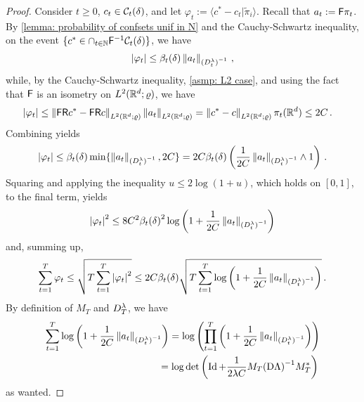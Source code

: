 \begin{proof}
    Consider $t\ge 0$, $c_t\in\mathcal{C}_t(\delta)$, and let $\varphi_t:=\langle c^* - c_t\vert \tilde\pi_i\rangle$. Recall that $a_t:=\mathsf{F}\pi_t$. By \cref{lemma: probability of confsets unif in N} and the Cauchy-Schwartz inequality, on the event $\{c^*\in \cap_{t\in\mathbb{N}}\mathsf{F}^{-1}\mathcal{C}_t(\delta)\}$, we have 
    \begin{align*}
        \left\lvert \varphi_t \right\rvert \le \beta_t(\delta)\left\lVert a_t\right\rVert_{{(D^\lambda_t)}^{-1}}\,,
    \end{align*}
    while, by the Cauchy-Schwartz inequality, \cref{asmp: L2 case}, and using the fact that $\mathsf{F}$ is an isometry on $L^2(\mathbb{R}^d;\varrho)$, we have 
    \begin{align*}
        \left\lvert \varphi_t \right\rvert &\le \left\lVert\mathsf{F}\mathsf{R} c^* - \mathsf{F}\mathsf{R} c\right\rVert_{L^2(\mathbb{R}^d;\varrho)}\left\lVert a_t\right\rVert_{L^2(\mathbb{R}^d;\varrho)}= \left\lVert c^*-c\right\rVert_{L^2(\mathbb{R}^d;\varrho)}\pi_t(\mathbb{R}^d)\le 2C\,.
    \end{align*}
    Combining yields
    \begin{align*}
        \left\lvert \varphi_t \right\rvert\le \beta_t(\delta)\min\{\left\lVert a_t\right\rVert_{{(D^\lambda_t)}^{-1}},2C\}=2C\beta_t(\delta)\left(\frac{1}{2C}\left\lVert a_t\right\rVert_{{(D^\lambda_t)}^{-1}}\wedge 1 \right) \,.
    \end{align*}
    Squaring and applying the inequality $u\le 2\log(1+u)$, which holds on $[0,1]$, to the final term, yields
    \begin{align*}
        \left\lvert \varphi_t \right\rvert^2\le 8C^2{\beta_t(\delta)}^2\log\left(1+ \frac{1}{2C}\left\lVert a_t\right\rVert_{{(D^\lambda_t)}^{-1}} \right)
    \end{align*}
    and, summing up,
    \begin{align}
        \sum_{t=1}^T \varphi_t\le \sqrt{T\sum_{t=1}^T \left\lvert \varphi_t \right\rvert^2}\le 2C\beta_t(\delta)\sqrt{T\sum_{t=1}^T \log\left(1+ \frac{1}{2C}\left\lVert a_t\right\rVert_{{(D^\lambda_t)}^{-1}}\right)} \label{eq: summation of widths in proof of the bound on width term lemma}\,.
    \end{align}
    By definition of $M_T$ and $D^\lambda_T$, we have
    \begin{align}
        \sum_{t=1}^T \log\left(1+ \frac{1}{2C}\left\lVert a_t\right\rVert_{{(D_t^\lambda)}^{-1}}\right)=\log\left(\prod_{t=1}^T \left(1+ \frac{1}{2C}\left\lVert a_t\right\rVert_{{(D_t^\lambda)}^{-1}}\right)\right)\notag\\
        =\log\det\left(\operatorname{Id} + \frac{1}{2\lambda C}M_T{(\mathrm{D}\Lambda)}^{-1}M_T^*\right)\,\label{eq: sum of log is logdet}
    \end{align}
    as wanted.
\end{proof}

